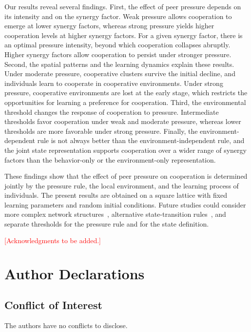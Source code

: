 \documentclass[%
  aip,cha,
  amsmath,amssymb,
  reprint,
  floatfix,
  article-title,
]{revtex4-2}
\newcommand{\AQ}[1]{\textcolor{red}{[#1]}}
\begin{document}
Our results reveal several findings. First, the effect of peer pressure depends on its intensity and on the synergy factor. Weak pressure allows cooperation to emerge at lower synergy factors, whereas strong pressure yields higher cooperation levels at higher synergy factors. For a given synergy factor, there is an optimal pressure intensity, beyond which cooperation collapses abruptly. Higher synergy factors allow cooperation to persist under stronger pressure. Second, the spatial patterns and the learning dynamics explain these results. Under moderate pressure, cooperative clusters survive the initial decline, and individuals learn to cooperate in cooperative environments. Under strong pressure, cooperative environments are lost at the early stage, which restricts the opportunities for learning a preference for cooperation. Third, the environmental threshold changes the response of cooperation to pressure. Intermediate thresholds favor cooperation under weak and moderate pressure, whereas lower thresholds are more favorable under strong pressure. Finally, the environment-dependent rule is not always better than the environment-independent rule, and the joint state representation supports cooperation over a wider range of synergy factors than the behavior-only or the environment-only representation.

These findings show that the effect of peer pressure on cooperation is determined jointly by the pressure rule, the local environment, and the learning process of individuals. The present results are obtained on a square lattice with fixed learning parameters and random initial conditions. Future studies could consider more complex network structures~\cite{shi2024model,zhu2025multilayer}, alternative state-transition rules~\cite{guo2022effect}, and separate thresholds for the pressure rule and for the state definition.


\begin{acknowledgments}
\AQ{Acknowledgments to be added.}
\end{acknowledgments}

\section*{Author Declarations}

\subsection*{Conflict of Interest}
The authors have no conflicts to disclose.
\end{document}
